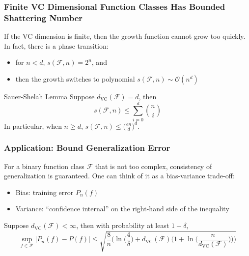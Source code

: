 \documentclass{beamer}
\begin{document}

\begin{frame}
\frametitle{Finite VC Dimensional Function Classes Has Bounded Shattering Number} 

If the VC dimension is finite, then the growth function cannot grow too quickly. In
fact, there is a phase transition: 
\begin{itemize}
    \item for $n < d$, $s(\mathcal{F}, n) = 2^n$, and  
    \item then the growth switches to polynomial $s(\mathcal{F}, n) \sim \mathcal{O}(n^d)$
\end{itemize}
\begin{block}{Sauer-Shelah Lemma}
Suppose $d_{\text{VC}}(\mathcal{F}) = d$, then 
$$ s(\mathcal{F}, n) \leq \sum_{i=0}^{d} \binom{n}{i} $$ 
In particular, when $n \geq d$, 
$ s(\mathcal{F}, n) \leq \big( \frac{en}{d} \big)^d $. 
\end{block}

\end{frame}


\begin{frame}
\frametitle{Application: Bound Generalization Error} 

For a binary function class $\mathcal{F}$ that is not too complex, consistency of generalization is guaranteed. One can think of it as a bias-variance trade-off: 
\begin{itemize}
    \item Bias: training error $P_n(f)$
    \item Variance: ``confidence internal'' on the right-hand side of the inequality 
\end{itemize}

\begin{block}{}
Suppose $d_{\text{VC}}(\mathcal{F}) < \infty$, then with probability at least $1 - \delta$, 
$$ \sup_{f \in \mathcal{F}} | P_n(f) - P(f) | \leq \sqrt{\frac{8}{n}\bigg( \ln\big( \frac{4}{\delta} \big) + d_{\text{VC}}(\mathcal{F}) \big( 1 + \ln\big( \frac{n}{d_{\text{VC}}(\mathcal{F})} \big) \big) \bigg)} $$
\end{block}

\end{frame}

\end{document}
